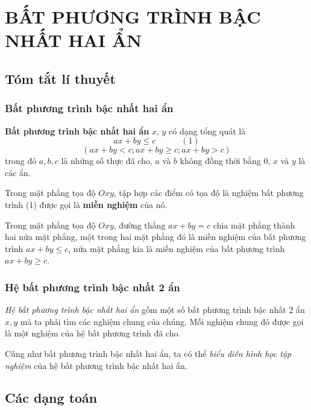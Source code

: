 \section{BẤT PHƯƠNG TRÌNH BẬC NHẤT HAI ẨN}
\subsection{Tóm tắt lí thuyết}
\subsubsection{Bất phương trình bậc nhất hai ẩn}
\begin{dn}
	\textbf{Bất phương trình bậc nhất hai ẩn} $x$, $y$ có dạng tổng quát là
	$$a x + b y \le c  \quad \quad \quad (1)$$ 
	$$(a x + b y < c; a x + b y \ge c; a x + b y > c)$$
	trong đó $a,b,c$ là những số thực đã cho, $a$ và $b$ không đồng thời bằng $0$, $x$ và $y$ là các ẩn.
\end{dn}

Trong mặt phẳng tọa độ $Oxy$, tập hợp các điểm có tọa độ là nghiệm bất phương trình (1) được gọi là \textbf{miền nghiệm} của nó.

\begin{note}
	Trong mặt phẳng tọa độ $Oxy$, đường thẳng $ax + by = c$ chia mặt phẳng thành hai nửa mặt phẳng, một trong hai mặt phẳng đó là miền nghiệm của bất phương trình $ax + by \le c$, nửa mặt phẳng kia là miền nghiệm của bất phương trình $ax + by \ge c$.
\end{note}

\subsubsection{Hệ bất phương trình bậc nhất 2 ẩn}
\begin{dn}
	\emph{Hệ bất phương trình bậc nhất hai ẩn} gồm một số bất phương trình bậc nhất 2 ẩn $x,y$ mà ta phải tìm các nghiệm chung của chúng. Mỗi nghiệm chung đó được gọi là một nghiệm của hệ bất phương trình đã cho.
	
	Cũng như bất phương trình bậc nhất hai ẩn, ta có thể \emph{biểu diễn hình học tập nghiệm} của hệ bất phương trình bậc nhất hai ẩn.
\end{dn}
\subsection{Các dạng toán}

